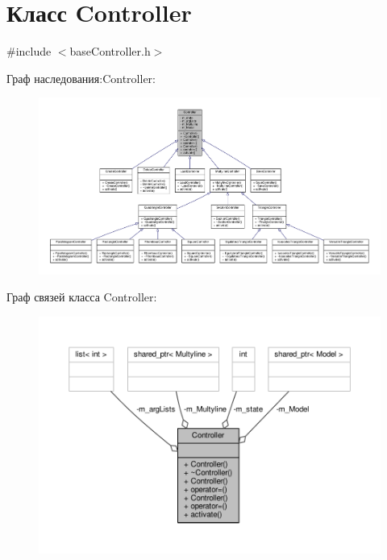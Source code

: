\hypertarget{class_controller}{\section{Класс Controller}
\label{class_controller}
}


{\ttfamily \#include $<$base\-Controller.\-h$>$}



Граф наследования\-:Controller\-:
\nopagebreak
\begin{figure}[H]
\begin{center}
\leavevmode
\includegraphics[width=350pt]{class_controller__inherit__graph}
\end{center}
\end{figure}


Граф связей класса Controller\-:
\nopagebreak
\begin{figure}[H]
\begin{center}
\leavevmode
\includegraphics[width=350pt]{class_controller__coll__graph}
\end{center}
\end{figure}
